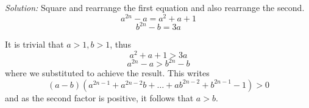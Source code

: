 \documentclass{article}
\begin{document}
\begin{enumerate}[1.]
\textit{Solution:}
Square and rearrange the first equation and also rearrange the second.
$$a^{2n} - a = a^2 + a + 1$$
$$b^{2n} - b = 3a$$

It is trivial that $a > 1, b > 1$, thus
$$a^2 + a + 1 > 3a$$
$$a^{2n} - a > b^{2n} - b$$
where we substituted to achieve the result. This writes
$$(a - b)(a^{2n - 1} + a^{2n - 2}b + \dots + ab^{2n - 2} + b^{2n - 1} - 1) > 0$$ 
and as the second factor is positive, it follows that $a > b$.


\end{enumerate}
\end{document}
